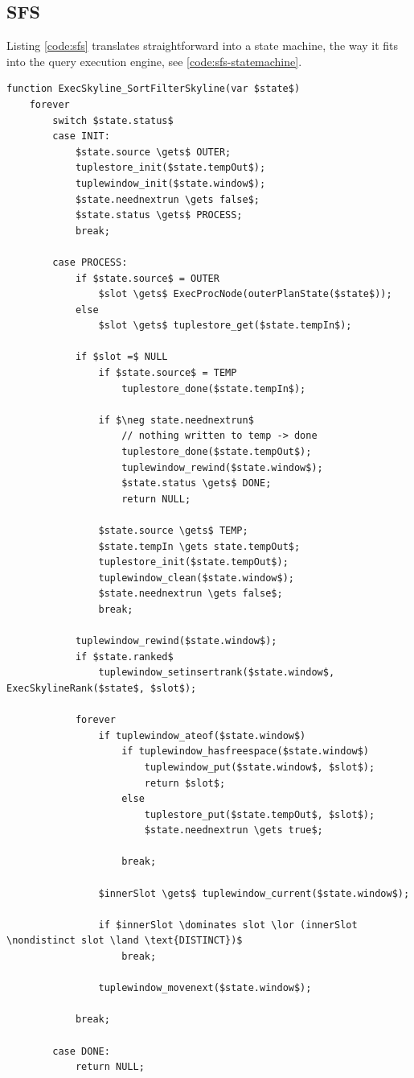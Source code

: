 
\subsection{SFS}
Listing \ref{code:sfs} translates straightforward into a state machine,
the way it fits into the query execution engine, see
\autoref{code:sfs-statemachine}.

\enlargethispage{\baselineskip}

\begin{lstlisting}[language=pseudo,
caption={SFS},
label={code:sfs-statemachine}
]
function ExecSkyline_SortFilterSkyline(var $state$)
	forever
		switch $state.status$
		case INIT: 
			$state.source \gets$ OUTER; 
			tuplestore_init($state.tempOut$);
			tuplewindow_init($state.window$);
			$state.neednextrun \gets false$;
			$state.status \gets$ PROCESS; 
			break;

		case PROCESS:
			if $state.source$ = OUTER
				$slot \gets$ ExecProcNode(outerPlanState($state$));
			else
				$slot \gets$ tuplestore_get($state.tempIn$);

			if $slot =$ NULL
				if $state.source$ = TEMP
					tuplestore_done($state.tempIn$);

				if $\neg state.neednextrun$
					// nothing written to temp -> done
					tuplestore_done($state.tempOut$);
					tuplewindow_rewind($state.window$);
					$state.status \gets$ DONE;
					return NULL;

				$state.source \gets$ TEMP;
				$state.tempIn \gets state.tempOut$;
				tuplestore_init($state.tempOut$);
				tuplewindow_clean($state.window$);
				$state.neednextrun \gets false$;
				break;

			tuplewindow_rewind($state.window$);
			if $state.ranked$
				tuplewindow_setinsertrank($state.window$, ExecSkylineRank($state$, $slot$);

			forever
				if tuplewindow_ateof($state.window$)
					if tuplewindow_hasfreespace($state.window$)
						tuplewindow_put($state.window$, $slot$);
						return $slot$;
					else
						tuplestore_put($state.tempOut$, $slot$);
						$state.neednextrun \gets true$;

					break;

				$innerSlot \gets$ tuplewindow_current($state.window$);

				if $innerSlot \dominates slot \lor (innerSlot \nondistinct slot \land \text{DISTINCT})$
					break;

				tuplewindow_movenext($state.window$);

			break;

		case DONE:
			return NULL;
\end{lstlisting}

